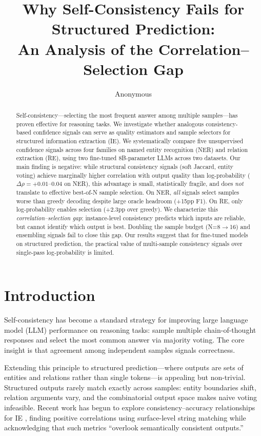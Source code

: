 \documentclass[11pt,a4paper]{article}
\title{Why Self-Consistency Fails for Structured Prediction:\\ An Analysis of the Correlation--Selection Gap}
\author{Anonymous}
\begin{document}
\maketitle

\begin{abstract}
Self-consistency---selecting the most frequent answer among multiple samples---has proven effective for reasoning tasks. We investigate whether analogous consistency-based confidence signals can serve as quality estimators and sample selectors for structured information extraction (IE). We systematically compare five unsupervised confidence signals across four families on named entity recognition (NER) and relation extraction (RE), using two fine-tuned 8B-parameter LLMs across two datasets. Our main finding is negative: while structural consistency signals (soft Jaccard, entity voting) achieve marginally higher correlation with output quality than log-probability ($\Delta\rho = +0.01$--$0.04$ on NER), this advantage is small, statistically fragile, and does \emph{not} translate to effective best-of-N sample selection. On NER, \emph{all} signals select samples worse than greedy decoding despite large oracle headroom (+15pp F1). On RE, only log-probability enables selection (+2.3pp over greedy). We characterize this \emph{correlation--selection gap}: instance-level consistency predicts which inputs are reliable, but cannot identify which output is best. Doubling the sample budget (N=8$\to$16) and ensembling signals fail to close this gap. Our results suggest that for fine-tuned models on structured prediction, the practical value of multi-sample consistency signals over single-pass log-probability is limited.
\end{abstract}

\section{Introduction}
\label{sec:intro}

Self-consistency \cite{wang2023selfconsistency} has become a standard strategy for improving large language model (LLM) performance on reasoning tasks: sample multiple chain-of-thought responses and select the most common answer via majority voting. The core insight is that agreement among independent samples signals correctness.

Extending this principle to structured prediction---where outputs are sets of entities and relations rather than single tokens---is appealing but non-trivial. Structured outputs rarely match exactly across samples: entity boundaries shift, relation arguments vary, and the combinatorial output space makes naive voting infeasible. Recent work has begun to explore consistency--accuracy relationships for IE \cite{nedellec2026consistency}, finding positive correlations using surface-level string matching while acknowledging that such metrics ``overlook semantically consistent outputs.''
\end{document}
